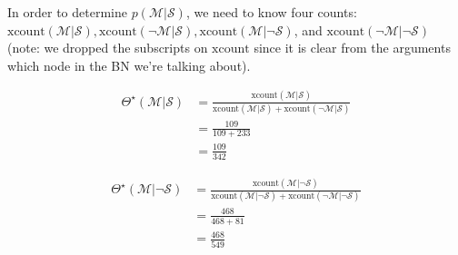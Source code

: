 \documentclass{tufte-handout}
\begin{document}
\item In order to determine $p(\mathcal{M} | \mathcal{S})$, we need to know four counts: $\mbox{xcount}(\mathcal{M}| \mathcal{S}), \mbox{xcount}(\neg \mathcal{M}| \mathcal{S}), \mbox{xcount}(\mathcal{M}|\neg \mathcal{S})$, and $\mbox{xcount}(\neg \mathcal{M}|\neg \mathcal{S})$ (note: we dropped the subscripts on $\mbox{xcount}$ since it is clear from the arguments which node in the BN we're talking about).

\begin{align}
\Theta^\star(\mathcal{M}|  \mathcal{S}) &= \frac{\mbox{xcount}(\mathcal{M}| \mathcal{S})}{\mbox{xcount}(\mathcal{M}| \mathcal{S}) + \mbox{xcount}(\neg \mathcal{M}|  \mathcal{S}) } \nonumber \\
&= \frac{109}{109+233} \nonumber \\
&= \frac{109}{342} \nonumber
\end{align}

\begin{align}
\Theta^\star(\mathcal{M}| \neg \mathcal{S}) &= \frac{\mbox{xcount}(\mathcal{M}| \neg \mathcal{S})}{\mbox{xcount}(\mathcal{M}| \neg \mathcal{S}) + \mbox{xcount}(\neg \mathcal{M}| \neg \mathcal{S}) } \nonumber \\
&= \frac{468}{468+81} \nonumber \\
&= \frac{468}{549} \nonumber
\end{align}
\end{document}
